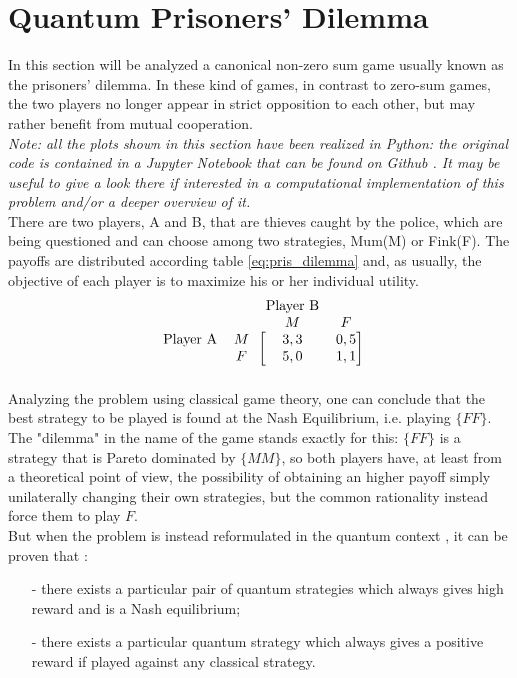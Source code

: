 \hfill

\section{Quantum Prisoners' Dilemma}
In this section will be analyzed a canonical non-zero sum game usually known as the prisoners' dilemma. In these kind of games, in contrast to zero-sum games, the two players no longer appear in strict opposition to each other, but may rather benefit from mutual cooperation. \\
\textit{
Note: all the plots shown in this section have been realized in Python: the original code is contained in a Jupyter Notebook that can be found on Github \cite{Pujatti_github}. It may be useful to give a look there if interested in a computational implementation of this problem and/or a deeper overview of it.}\\
There are two players, A and B, that are thieves caught by the police, which are being questioned and can choose among two strategies, Mum(M) or Fink(F). The payoffs are distributed according table \ref{eq:pris_dilemma} and, as usually, the objective of each player is to maximize his or her individual utility.
\begin{equation}
\begin{blockarray}{cccc}
& & \text{Player B}&\\
& & M & F\\
\begin{block}{cc[cc]}
\text{Player A} & M & 3,3 &  0,5 \\
 & F & 5,0 & 1,1 \\
\end{block}
\end{blockarray}
\label{eq:pris_dilemma}
\end{equation}
Analyzing the problem using classical game theory, one can conclude that the best strategy to be played is found at the Nash Equilibrium, i.e. playing $\{FF\}$. The "dilemma" in the name of the game stands exactly for this: $\{FF\}$ is a strategy that is Pareto dominated by $\{MM\}$, so both players have, at least from a theoretical point of view, the possibility of obtaining an higher payoff simply unilaterally changing their own strategies, but the common rationality instead force them to play $F$.\\
But when the problem is instead reformulated in the quantum context \cite{Eisert_2020}, it can be proven that :
\begin{itemize}[noitemsep]
	\item[-] there exists
a particular pair of quantum strategies which always gives high reward and is a Nash equilibrium;
	\item[-] there exists a particular quantum strategy which always gives a positive reward if played
against any classical strategy.
\end{itemize}
